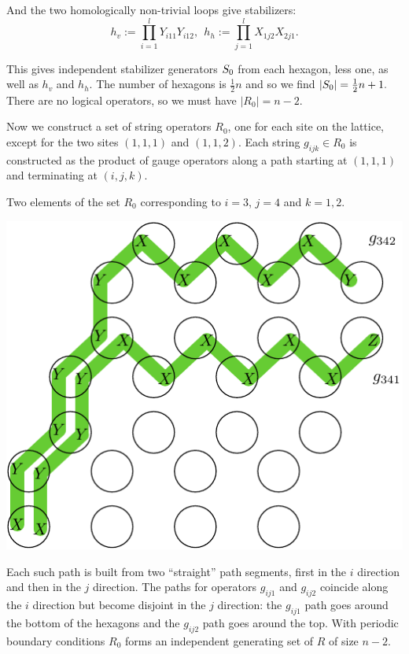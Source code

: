 \documentclass[12pt]{article}
\begin{document}
And the two homologically non-trivial loops
give stabilizers:
$$
h_v := \prod_{i=1}^l Y_{i11} Y_{i12},\ \ 
h_h := \prod_{j=1}^l X_{1j2} X_{2j1}.
$$

This gives independent stabilizer generators $S_0$
from each hexagon, less one, as well as $h_v$ and $h_h.$
The number of hexagons is $\frac{1}{2}n$ and
so we find $|S_0|=\frac{1}{2} n+1.$
There are no logical operators, so we
must have $|R_0|=n-2.$


Now we construct a set of string operators $R_0$,
one for each site on the lattice, except for
the two sites $(1,1,1)$ and $(1,1,2).$
Each string $g_{ijk}\in R_0$
is constructed as the product of
gauge operators along a path starting at
$(1,1,1)$ and terminating at $(i,j,k).$

Two elements of the set $R_0$ corresponding
to $i=3$, $j=4$ and $k=1,2.$
\begin{center}
\includegraphics[width=0.5\columnwidth]{fig_01.pdf}
\end{center}

Each such path is built from two ``straight''
path segments, first in the $i$ direction
and then in the $j$ direction. 
The paths for operators $g_{ij1}$ and
$g_{ij2}$ coincide along the $i$ direction
but become disjoint in the $j$ direction:
the $g_{ij1}$ path goes around the bottom
of the hexagons and the $g_{ij2}$ path
goes around the top.
With periodic boundary conditions $R_0$ forms an
independent generating set of $R$ of size $n-2.$
\end{document}
